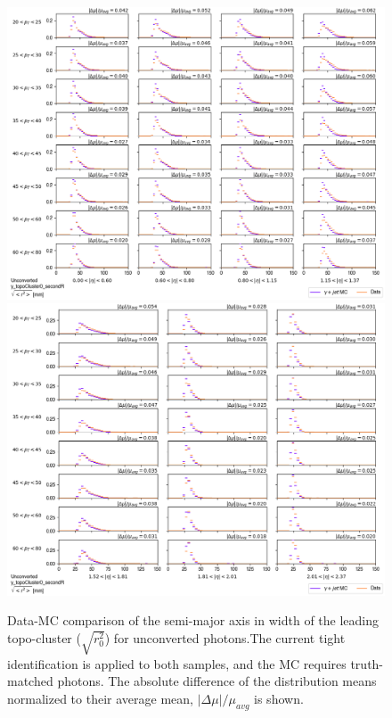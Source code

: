 \begin{figure}[!thp]
    \centering
    \includegraphics[width=.74\textwidth]{chapters/chapter4_photonID/images/y_topoCluster0_secondR_Unconverted_lowerEta.png}
    \includegraphics[width=.74\textwidth]{chapters/chapter4_photonID/images/y_topoCluster0_secondR_Unconverted_upperEta.png}
    \caption[Data-MC comparison of the semi-major axis in width of the leading topo-cluster ($\sqrt{r_0^2}$) for unconverted photons]{Data-MC comparison of the semi-major axis in width of the leading topo-cluster ($\sqrt{r_0^2}$) for unconverted photons.The current tight identification is applied to both samples, and the \gls{MC} requires truth-matched photons. The absolute difference of the distribution means normalized to their average mean, $|\Delta \mu|/\mu_{avg}$ is shown.}
    \label{fig:data-mc-secondR}
\end{figure}

